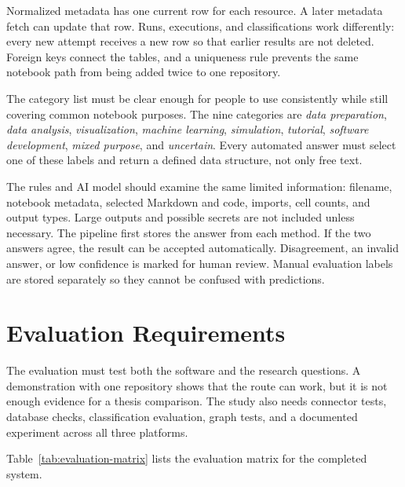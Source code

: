 Normalized metadata has one current row for each resource. A later metadata fetch can update that row. Runs, executions, and classifications work differently: every new attempt receives a new row so that earlier results are not deleted. Foreign keys connect the tables, and a uniqueness rule prevents the same notebook path from being added twice to one repository.

The category list must be clear enough for people to use consistently while still covering common notebook purposes. The nine categories are \emph{data preparation}, \emph{data analysis}, \emph{visualization}, \emph{machine learning}, \emph{simulation}, \emph{tutorial}, \emph{software development}, \emph{mixed purpose}, and \emph{uncertain}. Every automated answer must select one of these labels and return a defined data structure, not only free text.

The rules and AI model should examine the same limited information: filename, notebook metadata, selected Markdown and code, imports, cell counts, and output types. Large outputs and possible secrets are not included unless necessary. The pipeline first stores the answer from each method. If the two answers agree, the result can be accepted automatically. Disagreement, an invalid answer, or low confidence is marked for human review. Manual evaluation labels are stored separately so they cannot be confused with predictions.

\clearpage
\section{Evaluation Requirements}

The evaluation must test both the software and the research questions. A demonstration with one repository shows that the route can work, but it is not enough evidence for a thesis comparison. The study also needs connector tests, database checks, classification evaluation, graph tests, and a documented experiment across all three platforms.

Table~\ref{tab:evaluation-matrix} lists the evaluation matrix for the completed system.

